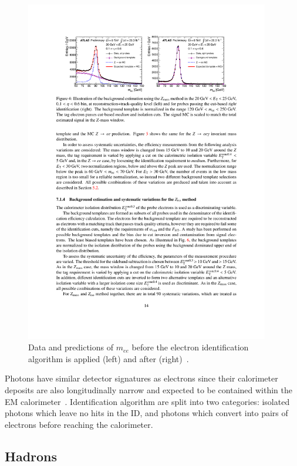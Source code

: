 \begin{figure}[tp]
  \centering
  \includegraphics[width=0.95\textwidth]{figures/performance/electron-ZeeTP}
  \caption{Data and predictions of $m_{ee}$ before the electron identification algorithm is applied (left) and after (right)~\cite{ATLAS-CONF-2014-032}.}
  \label{fig:objects-electron-id}
\end{figure}

Photons have similar detector signatures as electrons since their calorimeter deposits are also longitudinally narrow and expected to be contained within the EM calorimeter~\cite{ATLAS-CONF-2012-123}. Identification algorithm are split into two categories: isolated photons which leave no hits in the ID, and photons which convert into pairs of electrons before reaching the calorimeter.

\subsection{Hadrons}


